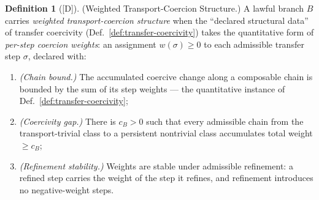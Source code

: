 \documentclass[12pt,oneside]{amsbook}
\theoremstyle{plain}
\theoremstyle{definition}
\newtheorem{definition}[theorem]{Definition}
\theoremstyle{remark}
\newcommand{\status}[1]{\textup{[#1]}}
\begin{document}
\begin{definition}[\status{D}]\label{def:vrp-weighted-coercion}
\textup{(Weighted Transport-Coercion Structure.)}
A lawful branch $B$ carries \emph{weighted transport-coercion
structure} when the ``declared structural data'' of transfer
coercivity (Def.~\ref{def:transfer-coercivity}) takes the
quantitative form of \emph{per-step coercion weights}: an
assignment $w(\sigma) \ge 0$ to each admissible transfer step
$\sigma$, declared with:
\begin{enumerate}[label=\textup{(W\arabic*)}]
  \item\label{wc:chain} \emph{(Chain bound.)}  The accumulated
    coercive change along a composable chain is bounded by the sum
    of its step weights --- the quantitative instance of
    Def.~\ref{def:transfer-coercivity};
  \item\label{wc:gap} \emph{(Coercivity gap.)}  There is
    $c_B > 0$ such that every admissible chain from the
    transport-trivial class to a persistent nontrivial class
    accumulates total weight $\ge c_B$;
  \item\label{wc:refine} \emph{(Refinement stability.)}  Weights
    are stable under admissible refinement: a refined step carries
    the weight of the step it refines, and refinement introduces
    no negative-weight steps.
\end{enumerate}
\end{definition}
\end{document}
